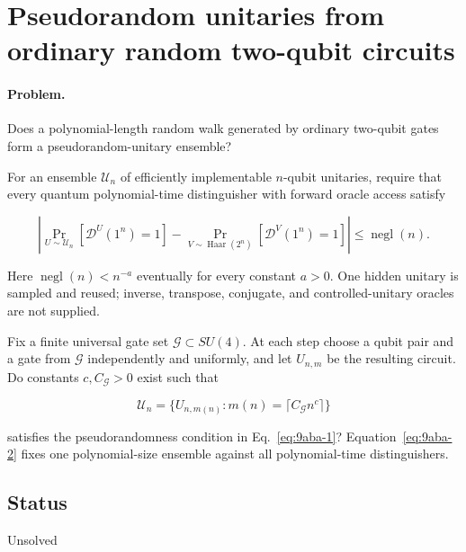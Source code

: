 \section{Pseudorandom unitaries from ordinary random two-qubit circuits}
\label{sec:op_9aba71db480b451a}

\paragraph{Problem.}
Does a polynomial-length random walk generated by ordinary two-qubit gates form a pseudorandom-unitary ensemble?

For an ensemble $\mathcal U_n$ of efficiently implementable $n$-qubit unitaries, require that every quantum polynomial-time distinguisher with forward oracle access satisfy

\begin{equation}
\left|\Pr_{U\sim\mathcal U_n}[\mathcal D^U(1^n)=1]
-\Pr_{V\sim\operatorname{Haar}(2^n)}[\mathcal D^V(1^n)=1]\right|
\leq\operatorname{negl}(n).
\label{eq:9aba-1}
\end{equation}

Here $\operatorname{negl}(n)<n^{-a}$ eventually for every constant $a>0$. One hidden unitary is sampled and reused; inverse, transpose, conjugate, and controlled-unitary oracles are not supplied.

Fix a finite universal gate set $\mathcal G\subset SU(4)$. At each step choose a qubit pair and a gate from $\mathcal G$ independently and uniformly, and let $U_{n,m}$ be the resulting circuit. Do constants $c,C_{\mathcal G}>0$ exist such that

\begin{equation}
\mathcal U_n=\{U_{n,m(n)}:m(n)=\lceil C_{\mathcal G}n^c\rceil\}
\label{eq:9aba-2}
\end{equation}

satisfies the pseudorandomness condition in Eq.~\eqref{eq:9aba-1}? Equation~\eqref{eq:9aba-2} fixes one polynomial-size ensemble against all polynomial-time distinguishers.

\subsection*{Status}

Unsolved

